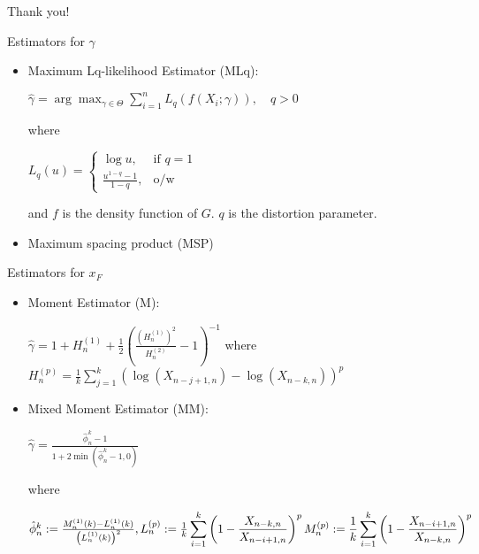 \documentclass{beamer}
\begin{document}
\begin{frame}[plain,c]

\begin{center}

\Huge Thank you!

\end{center}

\end{frame}

\begin{frame}{Estimators for $\gamma$}

\begin{itemize} 
\item Maximum Lq-likelihood Estimator (MLq):

\begin{center} $\hat{\gamma} = \arg \displaystyle \max_{\gamma \in \Theta} \sum_{i=1}^n L_q (f(X_i; \gamma)), \quad q >0$ \end{center}
where
\begin{center} $L_q(u) =  \begin{cases} \log u, & \text{if } q= 1 \\ \frac{u^{1-q} -1}{1-q}, & \text{o/w} \end{cases}$ 
\end{center}

and $f$ is the density function of $G$. $q$ is the distortion parameter.

\item Maximum spacing product (MSP)

\end{itemize}
\end{frame}

\begin{frame}{Estimators for $x_F$}

\begin{itemize} 
\item Moment Estimator (M):
\begin{center} $ \hat{\gamma} = 1+ H_n^{(1)} + \frac{1}{2} \left(\frac{\left(H_n^{(1)}\right)^2}{H_n^{(2)}}-1\right)^{-1} $ 
where $ H_n^{(p)} = \frac{1}{k} \displaystyle \sum_{j=1}^k \left(\log(X_{n-j+1,n}) - \log(X_{n-k,n}) \right)^p$
\end{center}
\item Mixed Moment Estimator (MM):

\begin{center} $\hat{\gamma} = \frac{\hat{\phi}_n^k -1}{1+ 2\min(\hat{\phi}_n^k -1, 0)}$  \end{center}

where

\begin{center} $\hat{\phi}_n^k := \frac{M_n^{(1)}(k) - L_n^{(1)}(k)}{\left(L_n^{(1)}(k)\right)^2}, L_n^{(p)} := \frac{1}{k} \displaystyle \sum_{i=1}^k \left( 1- \frac{X_{n-k,n}}{X_{n-i+1,n}}\right)^p\newline M_n^{(p)} := \frac{1}{k} \sum_{i=1}^k \left(1 - \frac{X_{n-i+1,n}}{X_{n-k,n}} \right)^p $ \end{center}


\end{itemize}
\end{frame}
\end{document}
